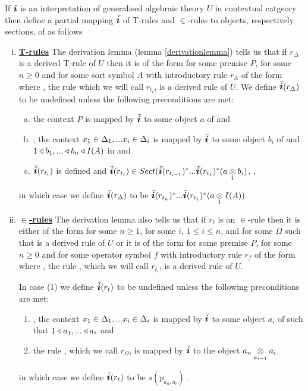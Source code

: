 \begin{definition} 
If $\iI$ is an interpretation of generalised algebraic theory $U$ in contextual catgeory \catcw
then define a
partial mapping $\Ibar$  of T-rules and $\in$-rules to objects, respectively sections, of \catcw
as follows
\begin{enumerate}[(i)] 
\item \underline{\textbf{T-rules}} 
The derivation lemma (lemma \ref{derivationlemma}) tells us that if $r_\Delta$ is a derived T-rule of $U$  then it is of the form  for some premise $P$, for some $n \geq 0$ and for some sort symbol $A$ with introductory rule $r_A$ of the form  where \foreachi, the rule 
 which we will call $r_{t_i}$, is a derived rule of $U$. 
We define $\Ibar(r_\Delta)$ to be undefined unless the following preconditions are met:
\begin{enumerate}[(a)]
\item
the context  $P$ is mapped by $\Ibar$ to some object $a$ of \catcw and 
\item
\foreachi, the context $\xDelta{i}$ is mapped by $\Ibar$ to some object $b_i$ of \catcw
and $1 \base b_1,...\base b_n \base I(A)$ in \catcw and
\item
$\Ibar(r_{t_i})$ is defined and $\Ibar(r_{t_i}) \in Sect(\Ibar(r_{t_{i-1}})^*...\Ibar(r_{t_1})^*(\crossx{a}{b_i}{1})$, \foreachi,
\end{enumerate}
in which case we define $\Ibar(r_\Delta)$ to be $\Ibar(r_{t_n})^*...\Ibar(r_{t_1})^*(\crossx{a}{I(A)}{1})$. 
\item \underline{\textbf{$\boldsymbol {\in}$-rules}} 
The derivation lemma also tells us that if $r_t$ is an $\in$-rule then it is  
either  of the form  for some $n \ge 1$, for some $i$, $1 \leq i \leq n$, 
and for some $\Omega$ such that  is a derived rule of $U$
or  it is of the form  for some premise $P$, for some $n \geq 0$ and for some operator symbol $f$ with introductory rule $r_f$ of the form  where \foreachi, the rule 
, which we will call $r_{t_i}$, is a derived rule of $U$. 

In  case (1) we define $\Ibar(r_t)$ to be undefined unless  the following preconditions are met:
\begin{enumerate}
\item
\foreachi, the context $\xDelta{i}$ is mapped by $\Ibar$ to some object $a_i$ of \catcw such
that $1 \base a_1,...\base a_i$ and
\item the rule , which we call $r_\Omega$, is mapped by $\Ibar$ to the object $\crossx{a_n}{a_i}{a_{i-1}}$
\end{enumerate}
in which case we define $\Ibar(r_t)$ to be $s(p_{a_n,a_i})$ . 


\end{enumerate}
\end{definition}
